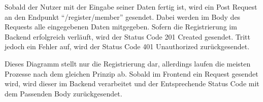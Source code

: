 Sobald der Nutzer mit der Eingabe seiner Daten fertig ist, wird ein Post Request an den
Endpunkt \enquote{/register/member} gesendet.
Dabei werden im Body des Requests alle eingegebenen Daten mitgegeben.
Sofern die Registrierung im Backend erfolgreich verläuft, wird der Status Code 201 Created gesendet.
Tritt jedoch ein Fehler auf, wird der Status Code 401 Unauthorized zurückgesendet. \medskip

Dieses Diagramm stellt nur die Registrierung dar, allerdings laufen die meisten Prozesse nach dem gleichen Prinzip
ab.
Sobald im Frontend ein Request gesendet wird, wird dieser im Backend verarbeitet und der Entsprechende Status Code
mit dem Passenden Body zurückgesendet.